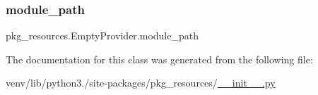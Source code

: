 \subsubsection{\texorpdfstring{module\+\_\+path}{module\_path}}
{\footnotesize\ttfamily pkg\+\_\+resources.\+Empty\+Provider.\+module\+\_\+path\hspace{0.3cm}{\ttfamily [static]}}



The documentation for this class was generated from the following file\+:\begin{DoxyCompactItemize}
\item 
venv/lib/python3./site-\/packages/pkg\+\_\+resources/\hyperlink{venv_2lib_2python3_89_2site-packages_2pkg__resources_2____init_____8py}{\+\_\+\+\_\+init\+\_\+\+\_\+.\+py}\end{DoxyCompactItemize}
